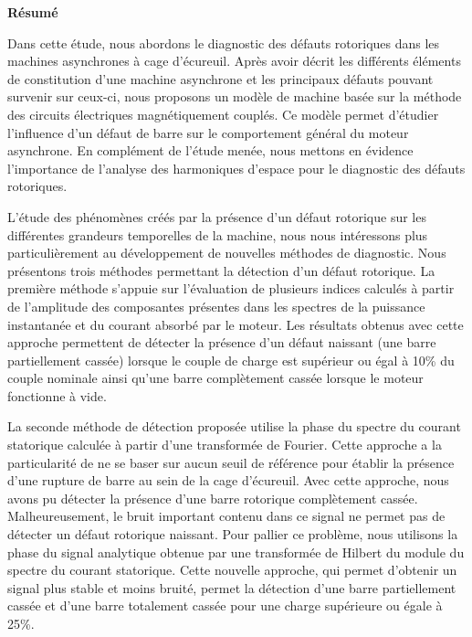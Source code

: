 \thispagestyle{empty}

\begin{center}
\textbf{\large{Résumé}}
\end{center}

\fontsize{11pt}{1}\selectfont

Dans cette étude, nous abordons le diagnostic des défauts
rotoriques dans les machines asynchrones à cage d'écureuil. Après
avoir décrit les différents éléments de constitution d'une machine
asynchrone et les principaux défauts pouvant survenir sur ceux-ci,
nous proposons un modèle de machine basée sur la méthode des
circuits électriques magnétiquement couplés. Ce modèle permet
d'étudier l'influence d'un défaut de barre sur le comportement
général du moteur asynchrone. En complément de l'étude menée, nous
mettons en évidence l'importance de l'analyse des harmoniques
d'espace pour le diagnostic des défauts rotoriques.

L'étude des phénomènes créés par la présence d'un défaut rotorique
sur les différentes grandeurs temporelles de la machine, nous nous
intéressons plus particulièrement au développement de nouvelles
méthodes de diagnostic. Nous présentons trois méthodes permettant
la détection d'un défaut rotorique. La première méthode s'appuie
sur l'évaluation de plusieurs indices calculés à partir de
l'amplitude des composantes présentes dans les spectres de la
puissance instantanée et du courant absorbé par le moteur. Les
résultats obtenus avec cette approche permettent de détecter la
présence d'un défaut naissant (une barre partiellement cassée)
lorsque le couple de charge est supérieur ou égal à 10\% du couple
nominale ainsi qu'une barre complètement cassée lorsque le moteur
fonctionne à vide.

La seconde méthode de détection proposée utilise la phase du
spectre du courant statorique calculée à partir d'une transformée
de Fourier. Cette approche a la particularité de ne se baser sur
aucun seuil de référence pour établir la présence d'une rupture de
barre au sein de la cage d'écureuil. Avec cette approche, nous
avons pu détecter la présence d'une barre rotorique complètement
cassée. Malheureusement, le bruit important contenu dans ce signal
ne permet pas de détecter un défaut rotorique naissant. Pour
pallier ce problème, nous utilisons la phase du signal analytique
obtenue par une transformée de Hilbert du module du spectre du
courant statorique. Cette nouvelle approche, qui permet d'obtenir
un signal plus stable et moins bruité, permet la détection d'une
barre partiellement cassée et d'une barre totalement cassée pour
une charge supérieure ou égale à 25\%.

